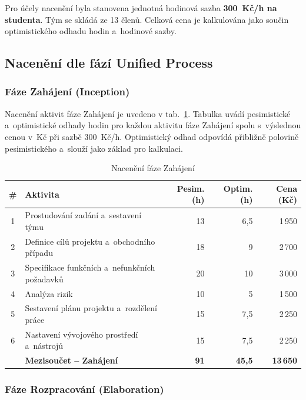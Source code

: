 \documentclass[a4paper, 11pt]{article}
\begin{document}
Pro účely nacenění byla stanovena jednotná hodinová sazba \textbf{300~Kč/h na studenta}. Tým se skládá ze 13 členů. Celková cena je kalkulována jako součin optimistického odhadu hodin a~hodinové sazby.

\subsection{Nacenění dle fází Unified Process}

\subsubsection{Fáze Zahájení (Inception)}

Nacenění aktivit fáze Zahájení je uvedeno v tab.~\ref{tab:cena-zahajeni}.
Tabulka uvádí pesimistické a~optimistické odhady hodin pro každou aktivitu fáze Zahájení spolu s~výslednou cenou v~Kč při sazbě 300~Kč/h. Optimistický odhad odpovídá přibližně polovině pesimistického a~slouží jako základ pro kalkulaci.

\begin{table}[H]
\centering\small
\begin{tabularx}{\textwidth}{c X r r r}
\toprule
\textbf{\#} & \textbf{Aktivita} & \textbf{Pesim. (h)} & \textbf{Optim. (h)} & \textbf{Cena (Kč)} \\
\midrule
1 & Prostudování zadání a~sestavení týmu & 13 & 6,5 & 1\,950 \\
2 & Definice cílů projektu a~obchodního případu & 18 & 9 & 2\,700 \\
3 & Specifikace funkčních a~nefunkčních požadavků & 20 & 10 & 3\,000 \\
4 & Analýza rizik & 10 & 5 & 1\,500 \\
5 & Sestavení plánu projektu a~rozdělení práce & 15 & 7,5 & 2\,250 \\
6 & Nastavení vývojového prostředí a~nástrojů & 15 & 7,5 & 2\,250 \\
\midrule
& \textbf{Mezisoučet -- Zahájení} & \textbf{91} & \textbf{45,5} & \textbf{13\,650} \\
\bottomrule
\end{tabularx}
\caption{Nacenění fáze Zahájení}
\label{tab:cena-zahajeni}
\end{table}

\subsubsection{Fáze Rozpracování (Elaboration)}
\end{document}
